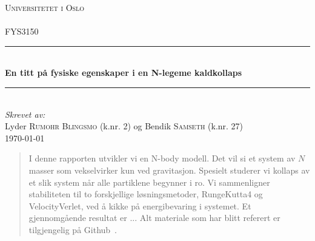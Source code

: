 \documentclass[11pt]{article}
\begin{document}
\begin{titlepage}
  \newcommand{\HRule}{\rule{\linewidth}{0.5mm}}
  \center
  \textsc{\LARGE Universitetet i Oslo}\\[1.5cm] %
  \textsc{\Large }\\[0.5cm] %
  \textsc{\large FYS3150}\\[0.5cm] %
  \HRule \\[0.4cm]
  { \huge \bfseries En titt på fysiske egenskaper
  i en N-legeme kaldkollaps}\\[0.4cm]
  \HRule \\[1.5cm]
  \Large \emph{Skrevet av:}\\
  Lyder \textsc{Rumohr Blingsmo} (k.nr. 2) og Bendik \textsc{Samseth} (k.nr. 27)\\[3cm]
  {\large \today}\\[3cm]
  \vfill
\end{titlepage}

\tableofcontents
\begin{abstract}
I denne rapporten utvikler vi en N-body modell. Det vil si et system av
$N$ masser som vekselvirker kun ved gravitasjon. Spesielt studerer vi kollaps
av et slik system når alle partiklene begynner i ro. Vi sammenligner 
stabiliteten til to forskjellige løsningsmetoder, RungeKutta4 og VelocityVerlet,
ved å kikke på energibevaring i systemet. Et gjennomgående resultat er ...
Alt materiale som har blitt referert er tilgjengelig
 på Github~\cite{github-repo}. 
\end{abstract}
\end{document}
